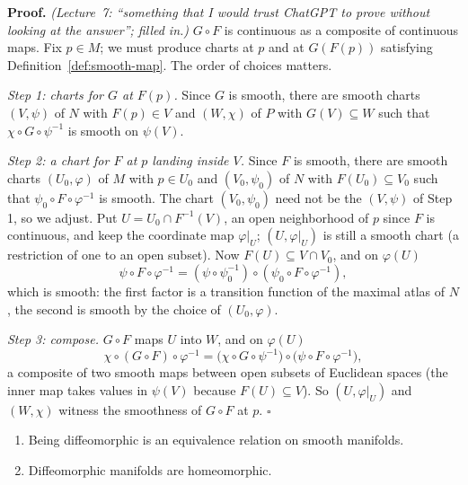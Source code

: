 \documentclass[11pt]{report}
\makeatletter
\newcounter{thmcounter}[section]
\renewenvironment{proof}[1][Proof]{\noindent\textbf{#1.} }{\hfill$\square$\par\vspace{5pt}}
\newcommand{\thmlabel}[1]{\edef\@currentlabel{\arabic{section}.\arabic{thmcounter}}\label{#1}}
\newcommand{\leeref}[1]{\par\smallskip{\raggedleft\footnotesize\textsc{Lee}:\ #1\par}}
\makeatother
\begin{document}
\begin{proof}
\textit{(Lecture~7: ``something that I would trust ChatGPT to prove without looking at the answer''; filled in.)} $G \circ F$ is continuous as a composite of continuous maps. Fix $p \in M$; we must produce charts at $p$ and at $G(F(p))$ satisfying Definition~\ref{def:smooth-map}. The order of choices matters.

\emph{Step 1: charts for $G$ at $F(p)$.} Since $G$ is smooth, there are smooth charts $(V, \psi)$ of $N$ with $F(p) \in V$ and $(W, \chi)$ of $P$ with $G(V) \subseteq W$ such that $\chi \circ G \circ \psi^{-1}$ is smooth on $\psi(V)$.

\emph{Step 2: a chart for $F$ at $p$ landing inside $V$.} Since $F$ is smooth, there are smooth charts $(U_0, \varphi)$ of $M$ with $p \in U_0$ and $(V_0, \psi_0)$ of $N$ with $F(U_0) \subseteq V_0$ such that $\psi_0 \circ F \circ \varphi^{-1}$ is smooth. The chart $(V_0,\psi_0)$ need not be the $(V,\psi)$ of Step 1, so we adjust. Put $U = U_0 \cap F^{-1}(V)$, an open neighborhood of $p$ since $F$ is continuous, and keep the coordinate map $\varphi|_U$; $(U, \varphi|_U)$ is still a smooth chart (a restriction of one to an open subset). Now $F(U) \subseteq V \cap V_0$, and on $\varphi(U)$
\[
\psi \circ F \circ \varphi^{-1} = (\psi \circ \psi_0^{-1}) \circ (\psi_0 \circ F \circ \varphi^{-1}),
\]
which is smooth: the first factor is a transition function of the maximal atlas of $N$, the second is smooth by the choice of $(U_0,\varphi)$.

\emph{Step 3: compose.} $G \circ F$ maps $U$ into $W$, and on $\varphi(U)$
\[
\chi \circ (G \circ F) \circ \varphi^{-1} = \big(\chi \circ G \circ \psi^{-1}\big) \circ \big(\psi \circ F \circ \varphi^{-1}\big),
\]
a composite of two smooth maps between open subsets of Euclidean spaces (the inner map takes values in $\psi(V)$ because $F(U) \subseteq V$). So $(U, \varphi|_U)$ and $(W, \chi)$ witness the smoothness of $G \circ F$ at $p$.
\end{proof}

\begin{propbox}\thmlabel{prop:diffeomorphic-equivalence}
\begin{enumerate}
    \item Being diffeomorphic is an equivalence relation on smooth manifolds.
    \item Diffeomorphic manifolds are homeomorphic.
\end{enumerate}
\leeref{Proposition 2.15}
\end{propbox}
\end{document}
